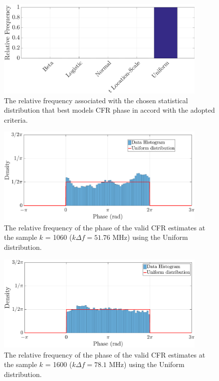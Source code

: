 \begin{figure}[h!]
	\centering
	\includegraphics[width=0.9\textwidth]{images/Phase_percentlW.eps}
	\caption{The relative frequency associated with the chosen statistical distribution that best models CFR phase in accord with the adopted criteria.}
	\label{Phase_percentlW}
\end{figure}

\begin{figure}[h!]
	\centering
	\includegraphics[width=0.9\textwidth]{images/Phase_histlW_2.eps}
	\caption{The relative frequency of the phase of the valid CFR estimates at the sample $k$ = 1060 ($k\Delta f= 51.76$ MHz) using the Uniform distribution.}
	\label{phase_examplelW}
\end{figure}

\begin{figure}[h!]
	\centering
	\includegraphics[width=0.9\textwidth]{images/Phase_hist2lW_2.eps}
	\caption{The relative frequency of the phase of the valid CFR estimates at the sample $k$ = 1600 ($k\Delta f= 78.1$ MHz) using the Uniform distribution.}
	\label{phase_example2lW}
\end{figure}

